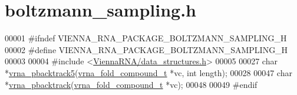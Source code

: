 \hypertarget{boltzmann__sampling_8h_source}{}\section{boltzmann\+\_\+sampling.\+h}
\label{boltzmann__sampling_8h_source}

\begin{DoxyCode}
00001 \textcolor{preprocessor}{#ifndef VIENNA\_RNA\_PACKAGE\_BOLTZMANN\_SAMPLING\_H}
00002 \textcolor{preprocessor}{#define VIENNA\_RNA\_PACKAGE\_BOLTZMANN\_SAMPLING\_H}
00003 
00004 \textcolor{preprocessor}{#include <\hyperlink{data__structures_8h}{ViennaRNA/data\_structures.h}>}
00005 
00027 \textcolor{keywordtype}{char}    *\hyperlink{group__subopt__stochbt_ga5a3e11d3ce121b5b045cb57f86a8ed05}{vrna\_pbacktrack5}(\hyperlink{group__fold__compound_structvrna__fc__s}{vrna\_fold\_compound\_t} *vc, \textcolor{keywordtype}{int} length);
00028 
00047 \textcolor{keywordtype}{char}    *\hyperlink{group__subopt__stochbt_ga0429de82e75af6c6e7508f4d273a192f}{vrna\_pbacktrack}(\hyperlink{group__fold__compound_structvrna__fc__s}{vrna\_fold\_compound\_t} *vc);
00048 
00049 \textcolor{preprocessor}{#endif}
\end{DoxyCode}
